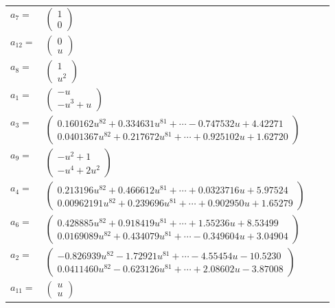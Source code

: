 \documentclass[1p]{elsarticle_modified}
\theoremstyle{definition}
\begin{document}
\begin{tabular}{m{7pt} m{180pt} m{7pt} m{180pt} }
\flushright $a_{7}=$&$\begin{pmatrix}1\\0\end{pmatrix}$ \\
\flushright $a_{12}=$&$\begin{pmatrix}0\\u\end{pmatrix}$ \\
\flushright $a_{8}=$&$\begin{pmatrix}1\\u^2\end{pmatrix}$ \\
\flushright $a_{1}=$&$\begin{pmatrix}- u\\- u^3+u\end{pmatrix}$ \\
\flushright $a_{3}=$&$\begin{pmatrix}0.160162 u^{82}+0.334631 u^{81}+\cdots-0.747532 u+4.42271\\0.0401367 u^{82}+0.217672 u^{81}+\cdots+0.925102 u+1.62720\end{pmatrix}$ \\
\flushright $a_{9}=$&$\begin{pmatrix}- u^2+1\\- u^4+2 u^2\end{pmatrix}$ \\
\flushright $a_{4}=$&$\begin{pmatrix}0.213196 u^{82}+0.466612 u^{81}+\cdots+0.0323716 u+5.97524\\0.00962191 u^{82}+0.239696 u^{81}+\cdots+0.902950 u+1.65279\end{pmatrix}$ \\
\flushright $a_{6}=$&$\begin{pmatrix}0.428885 u^{82}+0.918419 u^{81}+\cdots+1.55236 u+8.53499\\0.0169089 u^{82}+0.434079 u^{81}+\cdots-0.349604 u+3.04904\end{pmatrix}$ \\
\flushright $a_{2}=$&$\begin{pmatrix}-0.826939 u^{82}-1.72921 u^{81}+\cdots-4.55454 u-10.5230\\0.0411460 u^{82}-0.623126 u^{81}+\cdots+2.08602 u-3.87008\end{pmatrix}$ \\
\flushright $a_{11}=$&$\begin{pmatrix}u\\u\end{pmatrix}$ \\

\end{tabular}
\end{document}
